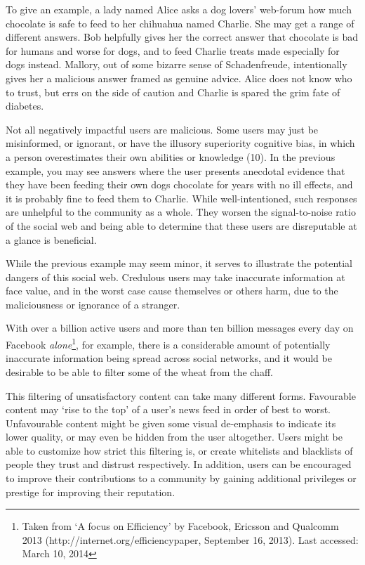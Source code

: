 \documentclass[]{final_report}
\begin{document}
To give an example, a lady named Alice asks a dog lovers' web-forum how much chocolate is safe to feed to her chihuahua named Charlie. She may get a range of different answers. Bob helpfully gives her the correct answer that chocolate is bad for humans and worse for dogs, and to feed Charlie treats made especially for dogs instead. Mallory, out of some bizarre sense of Schadenfreude, intentionally gives her a malicious answer framed as genuine advice. Alice does not know who to trust, but errs on the side of caution and Charlie is spared the grim fate of diabetes.

Not all negatively impactful users are malicious. Some users may just be misinformed, or ignorant, or have the illusory superiority cognitive bias, in which a person overestimates their own abilities or knowledge (10). In the previous example, you may see answers where the user presents anecdotal evidence that they have been feeding their own dogs chocolate for years with no ill effects, and it is probably fine to feed them to Charlie. While well-intentioned, such responses are unhelpful to the community as a whole. They worsen the signal-to-noise ratio of the social web and being able to determine that these users are disreputable at a glance is beneficial.

While the previous example may seem minor, it serves to illustrate the potential dangers of this social web. Credulous users may take inaccurate information at face value, and in the worst case cause themselves or others harm, due to the maliciousness or ignorance of a stranger.


With over a billion active users and more than ten billion messages every day on Facebook \textsl{alone}\footnote{Taken from `A focus on Efficiency' by Facebook, Ericsson and Qualcomm 2013 (http://internet.org/efficiencypaper, September 16, 2013). Last accessed: March 10, 2014}, for example, there is a considerable amount of potentially inaccurate information being spread across social networks, and it would be desirable to be able to filter some of the wheat from the chaff.

This filtering of unsatisfactory content can take many different forms. Favourable content may `rise to the top' of a user's news feed in order of best to worst. Unfavourable content might be given some visual de-emphasis to indicate its lower quality, or may even be hidden from the user altogether. Users might be able to customize how strict this filtering is, or create whitelists and blacklists of people they trust and distrust respectively. In addition, users can be encouraged to improve their contributions to a community by gaining additional privileges or prestige for improving their reputation.
\end{document}
